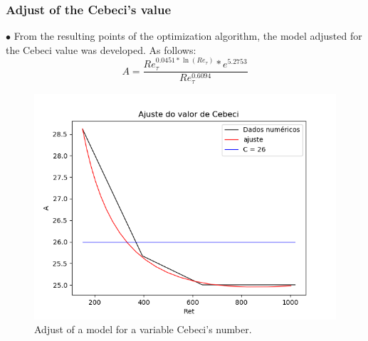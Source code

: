 \documentclass[xcolor=dvipsnames,8pt,aspectratio=34]{beamer}
\begin{document}
		\begin{frame}
		\frametitle{Adjust of the Cebeci's value}
		\begin{minipage}[h!]{0.45\textwidth}
			$\bullet$ From the resulting points of the optimization algorithm, the model adjusted for the Cebeci value was developed. As follows:
			\begin{equation}
			A = \frac{Re_\tau ^{0.0451 * \ln(Re_\tau)} *e ^ {5.2753} }{Re_\tau ^{0.6094}}
			\end{equation}
		\end{minipage}
		\begin{minipage}[h!]{0.51\textwidth}
			\begin{figure}
				\centering
				\includegraphics[angle=0, scale=0.45]{ajustecebeci}
				\caption{Adjust of a model for a variable Cebeci's number.}
			\end{figure}
		\end{minipage}
		\end{frame}	
	
	
	
	
	
\end{document}
